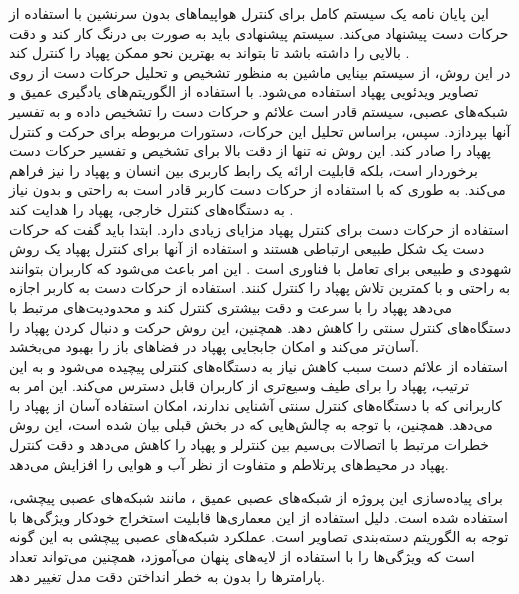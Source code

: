 این پایان نامه یک سیستم کامل برای کنترل هواپیماهای بدون سرنشین 
با استفاده از حرکات دست پیشنهاد می‌کند. سیستم پیشنهادی باید به صورت بی درنگ   کار کند و دقت بالایی را داشته باشد تا بتواند به بهترین نحو ممکن پهپاد را کنترل کند \cite{hadri2018hand}.
\\
در این روش، از سیستم بینایی ماشین به منظور تشخیص و تحلیل حرکات دست از روی تصاویر ویدئویی پهپاد استفاده می‌شود. با استفاده از الگوریتم‌های یادگیری عمیق و شبکه‌های عصبی، سیستم 
قادر است علائم و حرکات دست را تشخیص داده و به تفسیر آنها بپردازد. سپس، براساس تحلیل این حرکات، دستورات مربوطه برای حرکت و کنترل پهپاد را صادر کند.
 این روش نه تنها از دقت بالا برای تشخیص و تفسیر حرکات دست برخوردار است، بلکه قابلیت ارائه یک رابط کاربری بین انسان و پهپاد را نیز فراهم می‌کند. 
به طوری که با استفاده از حرکات دست کاربر قادر است به راحتی و بدون نیاز به دستگاه‌های کنترل خارجی، پهپاد را هدایت کند \cite{yoo2022motion}.
\\
استفاده از حرکات دست برای کنترل پهپاد مزایای زیادی دارد. ابتدا باید گفت که حرکات دست یک شکل طبیعی ارتباطی هستند و استفاده از آنها برای کنترل پهپاد یک روش شهودی و طبیعی برای تعامل با فناوری است
. این امر باعث می‌شود که کاربران بتوانند به راحتی و با کمترین تلاش پهپاد را کنترل کنند. استفاده از حرکات دست به کاربر اجازه می‌دهد پهپاد را با سرعت و دقت
بیشتری کنترل کند و محدودیت‌های مرتبط با دستگاه‌های کنترل سنتی را کاهش دهد. همچنین، این روش حرکت و دنبال کردن پهپاد را آسان‌تر می‌کند و امکان جابجایی پهپاد در فضا‌های باز را بهبود می‌بخشد.
\\
استفاده از علائم دست سبب کاهش نیاز به دستگاه‌های کنترلی پیچیده می‌شود و به این ترتیب، پهپاد را برای طیف وسیع‌تری از کاربران قابل دسترس می‌کند.
این امر به کاربرانی که با دستگاه‌های کنترل سنتی آشنایی ندارند، امکان استفاده آسان از پهپاد را می‌دهد. همچنین، با توجه به چالش‌هایی که در بخش قبلی بیان شده است، 
این روش خطرات مرتبط با اتصالات بی‌سیم بین کنترلر و پهپاد را کاهش می‌دهد و دقت کنترل پهپاد در محیط‌های پرتلاطم و متفاوت از نظر آب و هوایی را افزایش می‌دهد. 


برای پیاده‌سازی این پروژه از شبکه‌های عصبی عمیق 
، مانند شبکه‌های عصبی پیچشی، استفاده شده است. دلیل استفاده از این معماری‌ها قابلیت استخراج خودکار ویژگی‌ها با توجه به الگوریتم دسته‌بندی تصاویر
است. عملکرد شبکه‌های عصبی پیچشی به این گونه است که ویژگی‌ها را با استفاده از  لایه‌های پنهان
می‌آموزد، همچنین می‌تواند تعداد پارامترها را بدون به خطر انداختن دقت مدل تغییر دهد.

